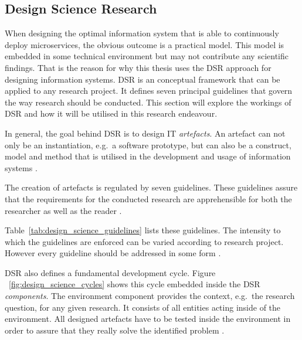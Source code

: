 
\subsection{Design Science Research}%
\label{sub:Design_Science_Research}

When designing the optimal information system that is able to continuously
deploy microservices, the obvious outcome is a practical model. This model is
embedded in some technical environment but may not contribute any scientific
findings. That is the reason for why this thesis uses the \ac{DSR} approach for
designing information systems. \ac{DSR} is an conceptual framework that can be
applied to any research project. It defines seven principal guidelines that
govern the way research should be conducted. This section will explore the
workings of \ac{DSR} and how it will be utilised in this research endeavour.

In general, the goal behind \ac{DSR} is to design \ac{IT} \textit{artefacts}.
An artefact can not only be an instantiation, e.g.\ a software prototype, but
can also be a construct, model and method that is utilised in the development
and usage of information systems \autocite[p.
82]{VonAlanDesignscienceinformation2004}.

The creation of artefacts is regulated by seven guidelines. These guidelines
assure that the requirements for the conducted research are apprehensible for
both the researcher as well as the reader \autocite[p.
82]{VonAlanDesignscienceinformation2004}.


Table~\ref{tab:design_science_guidelines} lists these guidelines. The intensity
to which the guidelines are enforced can be varied according to research
project.  However every guideline should be addressed in some form \autocite[p.
82]{VonAlanDesignscienceinformation2004}. 

\ac{DSR} also defines a fundamental development cycle. Figure
~\ref{fig:design_science_cycles} shows this cycle embedded inside the \ac{DSR}
\textit{components}. The environment component provides the context, e.g.\ the
research question, for any given research. It consists of all entities acting
inside of the environment. All designed artefacts have to be tested inside the
environment in order to assure that they really solve the identified problem
\autocite[p. 89]{HevnerThreeCycleView2007}.

